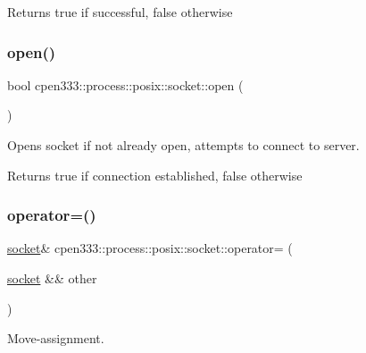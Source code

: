 \begin{DoxyReturn}{Returns}
true if successful, false otherwise 
\end{DoxyReturn}
\mbox{\label{classcpen333_1_1process_1_1posix_1_1socket_a0ac2e0452989cca9e6279602a8d73854}} 
\subsubsection{\texorpdfstring{open()}{open()}}
{\footnotesize\ttfamily bool cpen333\+::process\+::posix\+::socket\+::open (\begin{DoxyParamCaption}{ }\end{DoxyParamCaption})\hspace{0.3cm}{\ttfamily [inline]}}



Opens socket if not already open, attempts to connect to server. 

\begin{DoxyReturn}{Returns}
true if connection established, false otherwise 
\end{DoxyReturn}
\mbox{\label{classcpen333_1_1process_1_1posix_1_1socket_a0ebb354104529fd60a05b9de29919ce8}} 
\subsubsection{\texorpdfstring{operator=()}{operator=()}}
{\footnotesize\ttfamily \hyperlink{classcpen333_1_1process_1_1posix_1_1socket}{socket}\& cpen333\+::process\+::posix\+::socket\+::operator= (\begin{DoxyParamCaption}\item[{\hyperlink{classcpen333_1_1process_1_1posix_1_1socket}{socket} \&\&}]{other }\end{DoxyParamCaption})\hspace{0.3cm}{\ttfamily [inline]}}



Move-\/assignment. 


